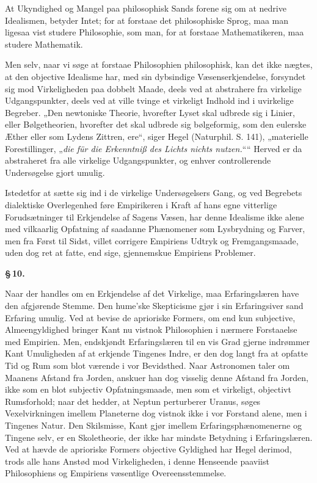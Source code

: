 \documentclass[12pt]{book}
\newcommand{\opage}[1]{\marginnote{\footnotesize\textit{[#1]}}}
\begin{document}
At Ukyndighed og Mangel paa philosophisk Sands forene sig om at nedrive Idealismen,
betyder Intet; for at forstaae det philosophiske Sprog, maa man ligesaa vist studere
Philosophie, som man, for at forstaae Mathematikeren, maa studere Mathematik.

\opage{52} Men selv, naar vi søge at forstaae Philosophien philosophisk, kan det ikke nægtes, at
den objective Idealisme har, med sin dybsindige Væsenserkjendelse, forsyndet sig mod
Virkeligheden paa dobbelt Maade, deels ved at abstrahere fra virkelige Udgangspunkter,
deels ved at ville tvinge et virkeligt Indhold ind i uvirkelige Begreber. „Den
newtoniske Theorie, hvorefter Lyset skal udbrede sig i Linier, eller Bølgetheorien,
hvorefter det skal udbrede sig bølgeformig, som den eulerske Æther eller som Lydens
Zittren, ere“, siger Hegel (Naturphil. S. 141), „materielle Forestillinger, „\textit{die
für die Erkenntniß des Lichts nichts nutzen.}““ Herved er da abstraheret fra alle
virkelige Udgangspunkter, og enhver controllerende Undersøgelse gjort umulig.

Istedetfor at sætte sig ind i de virkelige Undersøgelsers Gang, og ved Begrebets
dialektiske Overlegenhed føre Empirikeren i Kraft af hans egne vitterlige
Forudsætninger til Erkjendelse af Sagens Væsen, har denne Idealisme ikke alene med
vilkaarlig Opfatning af saadanne Phænomener som Lysbrydning og Farver, men fra Først
til Sidst, villet corrigere Empiriens Udtryk og Fremgangsmaade, uden dog ret at fatte,
end sige, gjennemskue Empiriens Problemer.

\begin{center}{\bfseries \S\,10.}\end{center}

Naar der handles om en Erkjendelse af det Virkelige, maa Erfaringslæren have den
afgjørende Stemme. Den hume'ske Skepticisme gjør i sin Erfaringsiver sand Erfaring
umulig. Ved at bevise de aprioriske Formers, om end kun subjective, Almeengyldighed
bringer Kant nu vistnok Philosophien i nærmere Forstaaelse med Empirien. Men,
endskjøndt Erfaringslæren til en vis Grad gjerne indrømmer Kant Umuligheden af at
erkjende Tingenes Indre, er den dog langt fra at opfatte Tid og Rum som blot værende i
vor Bevidsthed. Naar Astronomen taler om Maanens Afstand fra Jorden, anskuer han dog
visselig denne Afstand fra Jorden, ikke som en blot subjectiv Opfatningsmaade,
\opage{53} men som et virkeligt, objectivt Rumsforhold; naar det hedder, at Neptun perturberer
Uranus, søges Vexelvirkningen imellem Planeterne dog vistnok ikke i vor Forstand
alene, men i Tingenes Natur. Den Skilsmisse, Kant gjør imellem
Erfaringsphænomenerne og Tingene selv, er en Skoletheorie, der ikke har mindste
Betydning i Erfaringslæren. Ved at hævde de aprioriske Formers objective Gyldighed har
Hegel derimod, trods alle hans Anstød mod Virkeligheden, i denne Henseende paaviist
Philosophiens og Empiriens væsentlige Overeensstemmelse.
\end{document}
